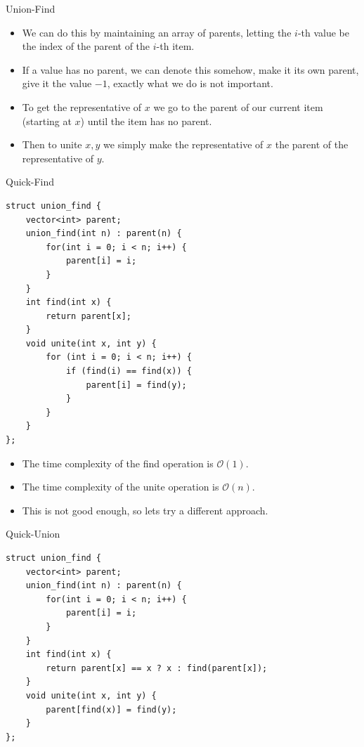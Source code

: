 \documentclass{beamer}
\begin{document}
\begin{frame}[plain]{Union-Find}
    \begin{itemize}
        \item<1-> We can do this by maintaining an array of parents, letting the $i$-th value be the index of the parent of the $i$-th item.
        \item<1-> If a value has no parent, we can denote this somehow, make it its own parent, give it the value $-1$, exactly what we do is not important.
        \item<2-> To get the representative of $x$ we go to the parent of our current item (starting at $x$) until the item has no parent.
        \item<2-> Then to unite $x, y$ we simply make the representative of $x$ the parent of the representative of $y$.
    \end{itemize}
\end{frame}

\begin{frame}{Quick-Find}
    \begin{footnotesize}
    \begin{verbatim}
struct union_find {
    vector<int> parent;
    union_find(int n) : parent(n) {
        for(int i = 0; i < n; i++) {
            parent[i] = i;
        }
    }
    int find(int x) {
        return parent[x];
    }
    void unite(int x, int y) {
        for (int i = 0; i < n; i++) {
            if (find(i) == find(x)) {
                parent[i] = find(y);
            }
        }
    }
};
    \end{verbatim}
    \end{footnotesize}
\end{frame}

\begin{frame}
    \begin{itemize}
        \item The time complexity of the find operation is $\mathcal{O}(1)$.
        \item The time complexity of the unite operation is $\mathcal{O}(n)$.
        \item This is not good enough, so lets try a different approach.
    \end{itemize}
\end{frame}

\begin{frame}{Quick-Union}
    \begin{small}
    \begin{verbatim}
struct union_find {
    vector<int> parent;
    union_find(int n) : parent(n) {
        for(int i = 0; i < n; i++) {
            parent[i] = i;
        }
    }
    int find(int x) {
        return parent[x] == x ? x : find(parent[x]);
    }
    void unite(int x, int y) {
        parent[find(x)] = find(y);
    }
};
    \end{verbatim}
    \end{small}
\end{frame}
\end{document}
